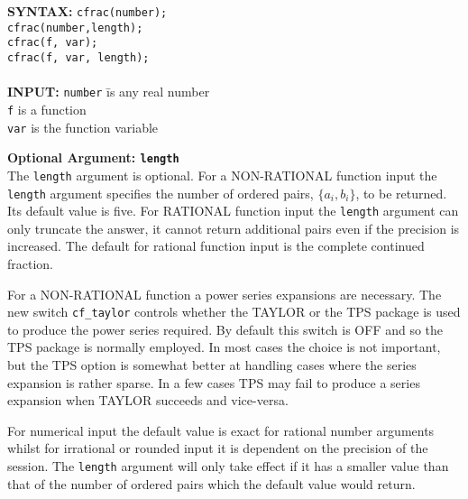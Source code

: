 \begin{tabbing}
{\bf SYNTAX:} \hspace{5mm} 
\= {\tt cfrac(number);}\\
\> {\tt cfrac(number,length);}\\
\> {\tt cfrac(f, var);}\\
\> {\tt cfrac(f, var, length);}\\ \\

{\bf INPUT:}
\> {\tt number} \hspace{3mm} \= is any real number\\
\> {\tt f}                   \> is a function\\
\> {\tt var}                 \> is the function variable\\
\end{tabbing}

{\bf Optional Argument: {\tt length}}\\
The \texttt{length} argument is optional. 
For a NON-RATIONAL function input the \texttt{length} argument specifies
the number of ordered pairs, $\{a_i,b_i\}$, to be 
returned. Its default value is five.
For RATIONAL function input the
\texttt{length} argument can only truncate the answer, it cannot
return additional pairs even if the precision is increased.
The default for rational function input is the complete continued
fraction.

For a NON-RATIONAL function a power series expansions are necessary. The new
switch \texttt{cf\_taylor} controls whether the TAYLOR or the TPS package is 
used to produce the power series required. By default this switch is OFF and
so the TPS package is normally employed.
In most cases the choice is not important, but the TPS option is somewhat better
at handling cases where the series expansion is rather sparse. In a few cases
TPS may fail to produce a series expansion when TAYLOR succeeds and vice-versa.

For numerical input the default value is exact for
rational number arguments whilst for irrational or rounded input it is
dependent on the precision of the session. The
\texttt{length} argument will only take effect if it has a smaller
value than that of the number of ordered pairs which the default
value would return.

